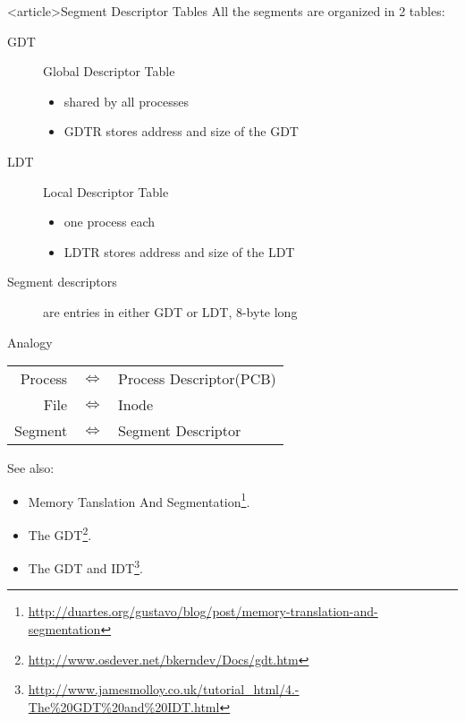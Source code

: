 \begin{frame}<article>{Segment Descriptor Tables}
    All the segments are organized in 2 tables:
    \begin{description}
    \item[GDT] \alert{Global Descriptor Table}
      \begin{itemize}
      \item shared by all processes
      \item GDTR stores address and size of the GDT
      \end{itemize}
    \item[LDT] \alert{Local Descriptor Table}
      \begin{itemize}
      \item one process each
      \item LDTR stores address and size of the LDT
      \end{itemize}
    \item[Segment descriptors] are entries in either GDT or LDT, 8-byte long
    \end{description}
      \begin{iblock}{Analogy}
        \begin{center}
          \begin{tabular}{rcl}
            Process&$\Longleftrightarrow$&Process Descriptor(PCB)\\
            File&$\Longleftrightarrow$&Inode\\
            Segment&$\Longleftrightarrow$&Segment Descriptor
          \end{tabular}
        \end{center}
      \end{iblock}
\end{frame}

See also:
\begin{itemize}
\item Memory Tanslation And Segmentation\footnote{\url{http://duartes.org/gustavo/blog/post/memory-translation-and-segmentation}}.
\item The GDT\footnote{\url{http://www.osdever.net/bkerndev/Docs/gdt.htm}}.
\item The GDT and IDT\footnote{\url{http://www.jamesmolloy.co.uk/tutorial_html/4.-The\%20GDT\%20and\%20IDT.html}}.
\end{itemize}

